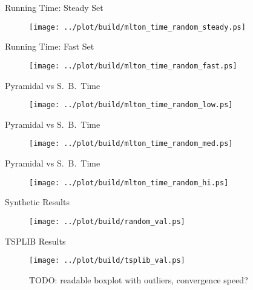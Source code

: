 \documentclass[
  size=8pt,
  style=klope,
  paper=screen,
  pauseslide,
  nopagebreaks,
  hlsections,
  fleqn
]{powerdot}
\def\todo{\color{red}}
\begin{document}
\begin{slide}[toc=Running Time]{Running Time: Steady Set}
  \begin{figure}[H]
    \centering
      \texttt{[image: ../plot/build/mlton\_time\_random\_steady.ps]}
  \end{figure}
\end{slide}
\begin{slide}[toc=]{Running Time: Fast Set}
  \begin{figure}[H]
    \centering
      \texttt{[image: ../plot/build/mlton\_time\_random\_fast.ps]}
  \end{figure}
\end{slide}
\begin{slide}[toc=]{Pyramidal vs S.\ B.\ Time}
  \begin{figure}[H]
    \centering
      \texttt{[image: ../plot/build/mlton\_time\_random\_low.ps]}
  \end{figure}
\end{slide}
\begin{slide}[toc=]{Pyramidal vs S.\ B.\ Time}
  \begin{figure}[H]
    \centering
      \texttt{[image: ../plot/build/mlton\_time\_random\_med.ps]}
  \end{figure}
\end{slide}
\begin{slide}[toc=]{Pyramidal vs S.\ B.\ Time}
  \begin{figure}[H]
    \centering
      \texttt{[image: ../plot/build/mlton\_time\_random\_hi.ps]}
  \end{figure}
\end{slide}

\begin{slide}[toc=Tours Computed]{Synthetic Results}
  \begin{figure}[H]
    \centering
    \texttt{[image: ../plot/build/random\_val.ps]}
  \end{figure}
\end{slide}

\begin{slide}[toc=]{TSPLIB Results}
  \begin{figure}[H]
    \centering
    \texttt{[image: ../plot/build/tsplib\_val.ps]}
    \caption{{\todo TODO:} readable boxplot with outliers, convergence speed?}
  \end{figure}
\end{slide}
\end{document}
